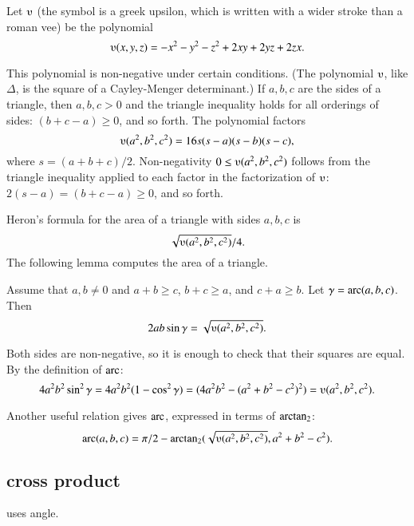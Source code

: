 \begin{definition}[$\ups$]\label{def:ups}
Let $\ups$ (the symbol is a greek upsilon, which is written with a
wider stroke than a roman vee) be the polynomial
    $$\ups(x,y,z) = -x^2 - y^2 - z^2 + 2 x y + 2 y z + 2 z x.$$
%
\end{definition}



This polynomial is non-negative under certain conditions. (The polynomial
$\ups$, like $\Delta$, 
is the square of a Cayley-Menger determinant.)  
If $a,b,c$ are the sides of a triangle, then $a,b,c>0$ and the triangle
inequality holds for all orderings of sides: $(b+c-a)\ge 0$, and so forth.
The polynomial factors
    $$\ups(a^2,b^2,c^2) = 16 s (s-a) (s-b) (s-c),$$
where $s = (a+b+c)/2$.
Non-negativity $0\le
\ups(a^2,b^2,c^2)$ follows from the triangle inequality applied to
each factor in the factorization of $\ups$: $2(s-a) = (b+c-a) \ge0$, and
so forth.  
%
%


Heron's formula for the area of 
a triangle with sides $a,b,c$ is $$\sqrt{\ups(a^2,b^2,c^2)}/4.$$  
%
The following
lemma  computes the area of a triangle.  

\begin{lemma}
Assume that $a,b\ne 0$ and $a+b\ge c$, $b+c\ge a$, and $c+a\ge b$.
Let $\gamma=\operatorname{arc}(a,b,c)$.  Then
        $$2 a b \sin\gamma = \sqrt{\ups(a^2,b^2,c^2)}.$$
\end{lemma}
%
%
%
\begin{proved}
Both sides are non-negative, so it is enough to check
that their squares are equal.  By the definition of $\operatorname{arc}$:
      $$4 a^2 b^2 \sin^2\gamma = 4 a^2 b^2 (1-\cos^2\gamma) = (4 a^2 b^2 - (a^2 + b^2 -
      c^2)^2) = \ups(a^2,b^2,c^2).$$
\swallowed\end{proved}

Another useful relation gives $\operatorname{arc}$, expressed in terms of ${\operatorname{arctan_2}}$:
  $$
  \arc(a,b,c) = 
    \pi/2 - \atn({\sqrt{\ups(a^2,b^2,c^2)}},{ a^2 + b^2 - c^2}).
    $$



\subsection{cross product} uses angle.

